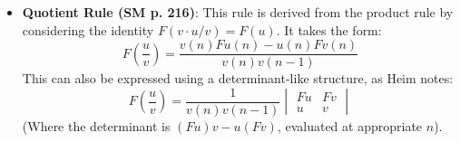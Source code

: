 \documentclass[12pt]{article}
\newcommand{\metron}{\tau}
\newcommand{\metrondifferential}{F} %
\newcommand{\metronenziffer}{n}
\begin{document}
\begin{itemize}
\begin{itemize}
\begin{equation}
        \label{eq:original_product_rule_metrondifferential}
        \end{equation}
        Heim also provides alternative, often more convenient or directly derivable forms, such as: \( \metrondifferential(uv) = u(\metronenziffer)\metrondifferential v(\metronenziffer) + v(\metronenziffer-1)\metrondifferential u(\metronenziffer) \) or, symmetrically, \( \metrondifferential(uv) = v(\metronenziffer)\metrondifferential u(\metronenziffer) + u(\metronenziffer-1)\metrondifferential v(\metronenziffer) \). The presence of the terms \( v(\metronenziffer-1) \) or \( u(\metronenziffer-1) \) (where, for example, \( v(\metronenziffer-1) = v(\metronenziffer) - \metrondifferential v(\metronenziffer) \)) directly reflects the backward difference definition of the \( \metrondifferential \) operator. The term \( -\metrondifferential u(\metronenziffer)\metrondifferential v(\metronenziffer) \) in the symmetric form explicitly captures the second-order effect that arises due to the finite step size of the Metron; this term naturally vanishes in the infinitesimal limit (\( \metron \to 0 \)) where \( (\metrondifferential u)(\metrondifferential v) \) would become a higher-order infinitesimal.
            \item \textbf{Quotient Rule (SM p. 216)}: This rule is derived from the product rule by considering the identity \( \metrondifferential(v \cdot u/v) = \metrondifferential(u) \). It takes the form:
    \[ \metrondifferential\left(\frac{u}{v}\right) = \frac{v(\metronenziffer)\metrondifferential u(\metronenziffer) - u(\metronenziffer)\metrondifferential v(\metronenziffer)}{v(\metronenziffer)v(\metronenziffer-1)} \]
    This can also be expressed using a determinant-like structure, as Heim notes:
    \[ \metrondifferential\left(\frac{u}{v}\right) = \frac{1}{v(\metronenziffer)v(\metronenziffer-1)} \begin{vmatrix} \metrondifferential u & \metrondifferential v \\ u & v \end{vmatrix} \]
    (Where the determinant is \( (\metrondifferential u)v - u(\metrondifferential v) \), evaluated at appropriate \(n\)).
    \end{itemize}


\end{itemize}
\end{document}

